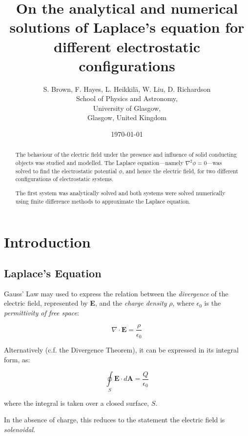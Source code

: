 \documentclass{article}
\newcommand{\be}{\begin{equation}}
\newcommand{\ee}{\end{equation}}
\begin{document}
\title{On the analytical and numerical solutions of Laplace's equation for different electrostatic configurations}
\author{S. Brown, F. Hayes, L. Heikkil{\"a}, W. Liu, D. Richardson\\
	School of Physics and Astronomy,\\
	University of Glasgow,\\
	Glasgow, United Kingdom}
\date{\today}
\maketitle

\begin{abstract}

The behaviour of the electric field under the presence and influence of solid
conducting objects was studied and modelled. The Laplace equation---namely
$\nabla ^2 \phi = 0$---was solved to find the electrostatic potential $\phi$,
and hence the electric field, for two different configurations of
electrostatic systems. 

The first system was analytically solved and both systems were solved numerically
using finite difference methods to approximate the Laplace equation.

\end{abstract} %

\section{Introduction}
\subsection{Laplace's Equation}

Gauss' Law may used to express the relation between the \emph{divergence} of the
electric field, represented by \textbf{E}, and the \emph{charge density} $\rho$,
where $\epsilon_0$ is the \emph{permittivity of free space}:

\be
\nabla \cdot \bm{E} = \frac{\rho}{\epsilon_0}
\ee

Alternatively (c.f. the Divergence Theorem), it can be expressed in its
integral form, as:

\be
\oint \limits_S \bm{E} \cdot d\bm{A} = \frac{Q}{\epsilon_0}
\ee

where the integral is taken over a closed surface, $S$.

In the absence of charge, this reduces to the statement the electric field
is \emph{solenoidal}.
\end{document}

